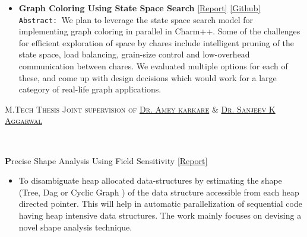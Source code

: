 \documentclass[9pt]{article}
\newenvironment{changemargin}[2]{%
  \begin{list}{}{%
    \setlength{\topsep}{0pt}%
    \setlength{\leftmargin}{#1}%
    \setlength{\rightmargin}{#2}%
    \setlength{\listparindent}{\parindent}%
    \setlength{\itemindent}{\parindent}%
    \setlength{\parsep}{\parskip}%
  }%
  \item[]}{\end{list}
}
\newcommand{\lineover}{
	\begin{changemargin}{-0.05in}{-0.05in}
		\vspace*{-8pt}
		\hrulefill \\
		\vspace*{-2pt}
	\end{changemargin}
}
\newcommand{\header}[1]{
	\begin{changemargin}{-0.5in}{-0.5in}
		\scshape{#1}\\
  	\lineover
	\end{changemargin}
}
\newenvironment{body} {
	\vspace*{-16pt}
	\begin{changemargin}{-0.25in}{-0.5in}
  }	
	{\end{changemargin}
}
\begin{document}
\begin{body}
\begin{itemize}
           \item \textbf{Graph Coloring Using State Space Search} 
           \href{http://web.engr.illinois.edu/~sdasgup3/Document/CS598_project_proposal.pdf}{[Report]}  
           \href{https://github.com/sdasgup3/ParallelSudoku}{[Github]} \\          
                                  \texttt{Abstract: }We plan to leverage the state space
                                  search model for implementing graph coloring
                                  in parallel in Charm++. Some of the
                                  challenges for efficient exploration of space
                                  by chares include intelligent pruning of the
                                  state space, load balancing, grain-size
                                  control and low-overhead communication
                                  between chares. We evaluated multiple options
                                  for each of these, and come up with design
                                  decisions which would work for a large
                                  category of real-life graph applications.
	\end{itemize}
\end{body}

\smallskip

\header{M.Tech Thesis \hfill Joint supervision of \href{http://www.cse.iitk.ac.in/users/karkare/}{Dr. Amey karkare} \& \href{http://www.cse.iitk.ac.in/users/ska/}{Dr.  Sanjeev K Aggarwal} }

\begin{body}
	\vspace{14pt}
	\textbf Precise Shape Analysis Using Field Sensitivity {\href{http://www.cse.iitk.ac.in/users/karkare/MTP/2010-11/sandeep2010precise.pdf}{[Report]}} \\
		\begin{itemize} \itemsep -0pt  
		\item[] To disambiguate heap allocated data-structures by estimating the shape (Tree, Dag or Cyclic Graph ) of the data structure 
			accessible from each heap directed pointer. This will help in automatic parallelization of sequential code having heap 
			intensive data structures. The work mainly focuses on devising a novel shape analysis technique. 
		\end{itemize}
\end{body}
\end{document}

